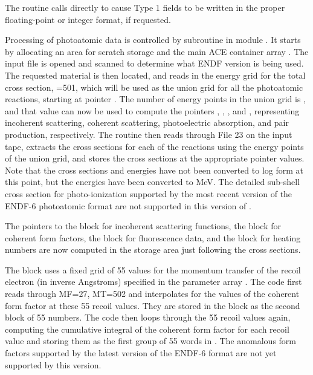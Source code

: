 The  routine calls  directly to
cause Type 1 fields to be written in the proper floating-point or
integer format, if requested.

Processing of photoatomic data is controlled by subroutine
 in module
.  It starts by
allocating an area for scratch storage  and the main
ACE container array .  The input file is opened and
scanned to determine what ENDF version is being used.   The
requested material  is then located, and
 reads in the energy grid for the total
cross section, =501, which will be used as the union grid
for all the photoatomic reactions, starting at pointer .
The number of energy points in the union grid is , and that
value can now be used to compute the pointers ,
, , and , representing incoherent
scattering, coherent scattering, photoelectric absorption, and pair
production, respectively.  The  routine then reads
through File 23 on the input tape, extracts the cross sections for
each of the reactions using the energy points of the union grid, and
stores the cross sections at the appropriate pointer values.  Note
that the cross sections and energies have not been converted to log
form at this point, but the energies have been converted to MeV.
The detailed sub-shell cross section for photo-ionization supported
by the most recent version of the ENDF-6 photoatomic format are
not supported in this version of .

The pointers to the  block for incoherent scattering
functions, the  block for coherent form factors, the
 block for fluorescence data, and the 
block for heating numbers are now computed in the storage
area just following the cross sections.

The  block uses a fixed grid of 55 values for the momentum
transfer of the recoil electron (in inverse Angstroms) specified in
the parameter array .  The code first reads through
MF=27, MT=502 and interpolates for the values of the coherent form
factor at these 55 recoil values.  They are stored in the
 block as the second block of 55 numbers.  The code
then loops through the 55 recoil values again, computing the
cumulative integral of the coherent form factor for each recoil
value and storing them as the first group of 55 words in .
The anomalous form factors supported by the latest version of the
ENDF-6 format are not yet supported by this version.

